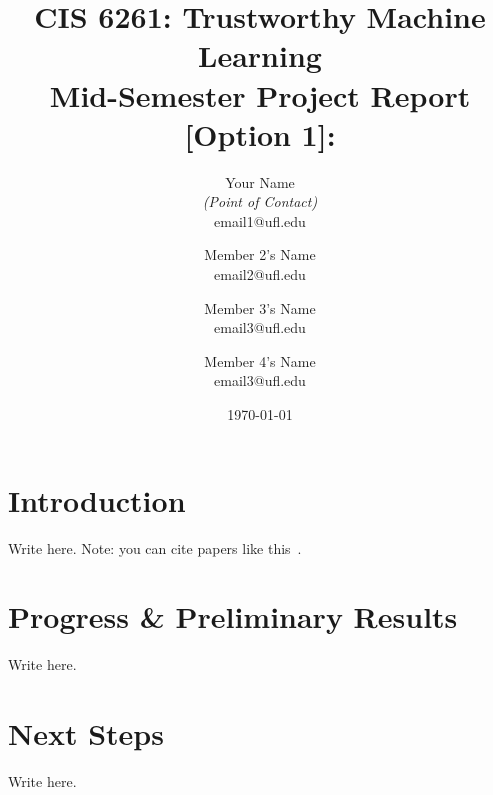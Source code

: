 \documentclass[11pt,letterpaper]{article}
\title{CIS 6261: Trustworthy Machine Learning\\
	\Large Mid-Semester Project Report [Option 1]: } %
\author{
        Your Name \\{\em (Point of Contact)} \\
        email1@ufl.edu\\
        \and
        Member 2's Name \\
        email2@ufl.edu\\
        \and
        Member 3's Name \\
        email3@ufl.edu\\
        \and
        Member 4's Name \\
        email3@ufl.edu\\
}
\date{\today}
\begin{document}

\maketitle



\section{Introduction}
Write here. Note: you can cite papers like this~\cite{vapnik1994measuring}.


\section{Progress \& Preliminary Results}
Write here.


\section{Next Steps}
Write here.





\end{document}
